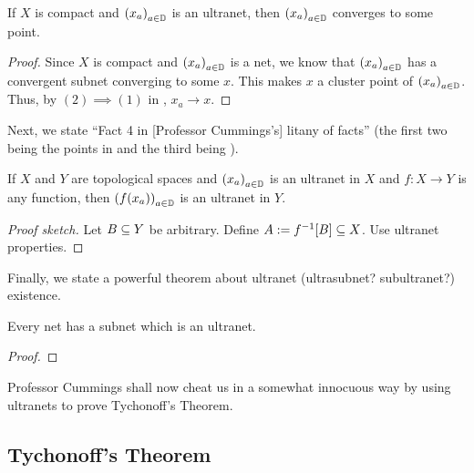 \begin{boxcorollary}\label{Ch2:Cor:Ultranet_tendsTo_in_compact}
    If $X$ is compact and $\left( x_a \right)_{a \in \mathbb{D}}$ is an ultranet, then $\left( x_a \right)_{a \in \mathbb{D}}$ converges to some point.
\end{boxcorollary}
\begin{proof}
    Since $X$ is compact and $\left( x_a \right)_{a \in \mathbb{D}}$ is a net, we know that $\left( x_a \right)_{a \in \mathbb{D}}$ has a convergent subnet converging to some $x$. This makes $x$ a cluster point of $\left( x_a \right)_{a \in \mathbb{D}}$. Thus, by $(2) \implies (1)$ in , $x_a \to x$.
\end{proof}

Next, we state ``Fact 4 in [Professor Cummings's] litany of facts'' (the first two being the points in  and the third being ).

\begin{boxcorollary}\label{Ch2:Cor:Func_comp_Ultranet_is_Ultranet}
    If $X$ and $Y$ are topological spaces and $\left( x_a \right)_{a \in \mathbb{D}}$ is an ultranet in $X$ and $f : X \to Y$ is any function, then $\left( f\!\left( x_a \right) \right)_{a \in \mathbb{D}}$ is an ultranet in $Y$.
\end{boxcorollary}
\begin{proof}[Proof sketch]
    Let $B \subseteq Y$ be arbitrary. Define $A := f^{-1}\!\left[ B \right] \subseteq X$. Use ultranet properties.
\end{proof}

Finally, we state a powerful theorem about ultranet (ultrasubnet? subultranet?) existence.

\begin{boxproposition}\label{Ch2:Prop:Subnet_Ultranet_Existence}
    Every net has a subnet which is an ultranet.
\end{boxproposition}
\begin{proof}
    \sorry
\end{proof}

Professor Cummings shall now cheat us in a somewhat innocuous way by using ultranets to prove Tychonoff's Theorem.

\subsection{Tychonoff's Theorem} %


